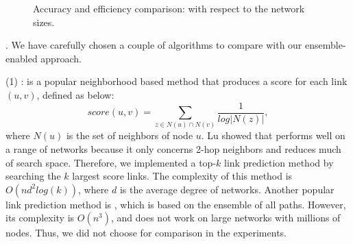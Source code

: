 \begin{figure}[tb!]
   \hspace{-2ex}
  \hspace{-2ex}
  \hspace{-2ex}
  \vspace{-2ex}
  \caption{Accuracy and efficiency comparison: with respect to the network sizes.}\label{fig_exp_1_2}
  \vspace{-3ex}
\end{figure}




. We have carefully chosen a couple of algorithms
to compare with our ensemble-enabled approach.


  \noindent (1) \Adamic \cite{adamic}: \Aa is a popular neighborhood based method that
  produces a score for each link $(u, v)$, defined as below:
  \vspace{-2ex}
  \[ score(u, v) = \sum_{z \in N(u)\cap N(v)}\frac{1}{log|N(z)|}, \]
    \vspace{-.5ex}
  where $N(u)$ is the set of neighbors of node $u$. Lu \cite{linyuan-2011} showed that
  \Aa performs well on a range of networks because it only concerns 2-hop neighbors and
  reduces much of search space. Therefore, we implemented a top-$k$ link prediction
  method by searching the $k$ largest \Aa score links. The complexity of this method is
  $O(nd^2log(k))$, where $d$ is the average degree of networks. Another popular link
  prediction method is \Katz \cite{katz-1953}, which is based on the ensemble of all paths. However, its
  complexity is $O(n^3)$, and does not work on large networks with millions
  of nodes. Thus, we did not choose \Katz for comparison in the experiments.



